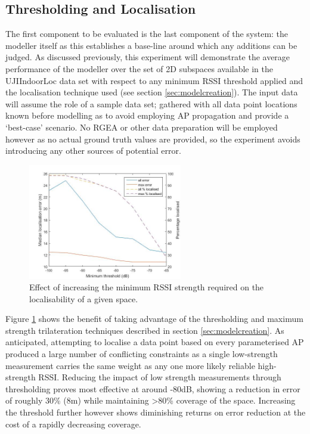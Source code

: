 \documentclass{UoYCSproject}
\begin{document}
            \subsection{Thresholding and Localisation}
            
	            The first component to be evaluated is the last component of the system: the modeller itself as this establishes a base-line around which any additions can be judged. As discussed previously, this experiment will demonstrate the average performance of the modeller over the set of 2D subspaces available in the UJIIndoorLoc data set with respect to any minimum RSSI threshold applied and the localisation technique used (see section \ref{sec:modelcreation}). The input data will assume the role of a sample data set; gathered with all data point locations known before modelling as to avoid employing AP propagation and provide a `best-case' scenario. No RGEA or other data preparation will be employed however as no actual ground truth values are provided, so the experiment avoids introducing any other sources of potential error.
            
                \begin{figure}[h]
                    \label{fig:threshold}
                    \centering
                    \includegraphics[width=0.6\textwidth]{threshold.jpg}
                    \caption{Effect of increasing the minimum RSSI strength required on the localisability of a given space.}
                \end{figure}
                
                Figure \ref{fig:threshold} shows the benefit of taking advantage of the thresholding and maximum strength trilateration techniques described in section \ref{sec:modelcreation}. As anticipated, attempting to localise a data point based on every parameterised AP produced a large number of conflicting constraints as a single low-strength measurement carries the same weight as any one more likely reliable high-strength RSSI. Reducing the impact of low strength measurements through thresholding proves most effective at around -80dB, showing a reduction in error of roughly 30\% (8m) while maintaining >80\% coverage of the space. Increasing the threshold further however shows diminishing returns on error reduction at the cost of a rapidly decreasing coverage.
                
\end{document}

